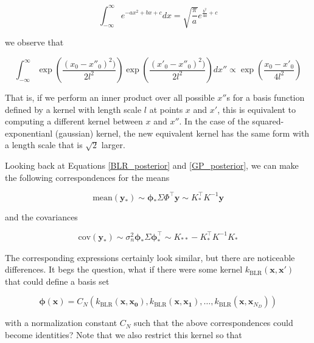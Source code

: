 \documentclass{article}
\begin{document}
\begin{equation}
    \int_{-\infty}^{\infty}e^{-a x^2 + b x + c}dx = \sqrt{\frac{\pi}{a}}e^{\frac{b^2}{4a}+c}
\end{equation}

we observe that 

\begin{equation}
    \int_{-\infty}^{\infty}\exp\left(\frac{(x_0-x''_0)^2)}{2l^2}\right)\exp\left(\frac{(x'_0-x''_0)^2)}{2l^2}\right)dx''\propto\exp\left(\frac{x_0-x'_0}{4l^2}\right)
\end{equation}

That is, if we perform an inner product over all possible $x''$s for a basis function defined by a kernel with length scale $l$ at points $x$ and $x'$, this is equivalent to computing a different kernel between $x$ and $x''$. In the case of the squared-exponentianl (gaussian) kernel, the new equivalent kernel has the same form with a length scale that is $\sqrt{2}$ larger.

Looking back at Equations \ref{BLR_posterior} and \ref{GP_posterior}, we can make the following correspondences for the means

\begin{equation}
    \text{mean}(\mathbf{y}_\ast)\sim\boldsymbol{\phi}_\ast \Sigma \Phi^\top \mathbf{y} \sim K_\ast^\top K^{-1} \mathbf{y}
\end{equation}

and the covariances

\begin{equation}
   \text{cov}(\mathbf{y}_\ast) \sim \sigma_n^2\boldsymbol{\phi}_\ast\Sigma\boldsymbol{\phi}_\ast^\top \sim K_{\ast\ast} - K_\ast^\top K^{-1} K_\ast
\end{equation}

The corresponding expressions certainly look similar, but there are noticeable differences. It begs the question, what if there were some kernel $k_\text{BLR}(\mathbf{x},\mathbf{x}')$ that could define a basis set 

\begin{equation}
    \boldsymbol{\phi}(\mathbf{x})=C_N(k_\text{BLR}(\mathbf{x},\mathbf{x_0}),k_\text{BLR}(\mathbf{x},\mathbf{x_1}),\dots,k_\text{BLR}(\mathbf{x},\mathbf{x}_{N_D}))
\end{equation}

with a normalization constant $C_N$ such that the above correspondences could become identities? Note that we also restrict this kernel so that 
\end{document}
